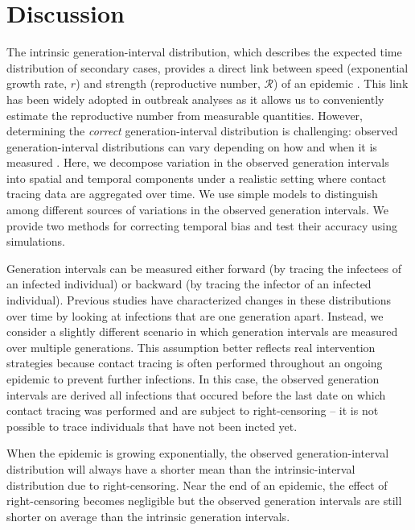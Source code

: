\documentclass[12pt]{article}
\newcommand{\RR}{\ensuremath{{\mathcal R}}}
\begin{document}
\section{Discussion}

The intrinsic generation-interval distribution, which describes the expected time distribution of secondary cases, provides a direct link between speed (exponential growth rate, $r$) and strength (reproductive number, $\RR$) of an epidemic \citep{wallinga2007generation, park2019practical}.
This link has been widely adopted in outbreak analyses as it allows us to conveniently estimate the reproductive number from measurable quantities.
However, determining the \emph{correct} generation-interval distribution is challenging: observed generation-interval distributions can vary depending on how and when it is measured \citep{nishiura2010time, tomba2010some, champredon2015intrinsic, britton2019estimation}.
Here, we decompose variation in the observed generation intervals into spatial and temporal components under a realistic setting where contact tracing data are aggregated over time.
We use simple models to distinguish among different sources of variations in the observed generation intervals.
We provide two methods for correcting temporal bias and test their accuracy using simulations.

Generation intervals can be measured either forward (by tracing the infectees of an infected individual) or backward (by tracing the infector of an infected individual).
Previous studies have characterized changes in these distributions over time by looking at infections that are one generation apart.
Instead, we consider a slightly different scenario in which generation intervals are measured over multiple generations.
This assumption better reflects real intervention strategies because contact tracing is often performed throughout an ongoing epidemic to prevent further infections. 
In this case, the observed generation intervals are derived all infections that occured before the last date on which contact tracing was performed and are subject to right-censoring -- it is not possible to trace individuals that have not been incted yet.

When the epidemic is growing exponentially, the observed generation-interval distribution will always have a shorter mean than the intrinsic-interval distribution due to right-censoring.
Near the end of an epidemic, the effect of right-censoring becomes negligible but the observed generation intervals are still shorter on average than the intrinsic generation intervals.
\end{document}
